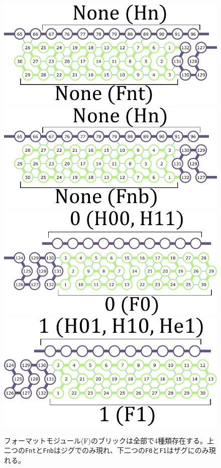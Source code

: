 \documentclass[a4j,11pt]{article}
\begin{document}
%
%
\begin{figure}[tb]
  \centering
   \includegraphics[width=0.6\linewidth]{fig/svg/Fnt_1.pdf}\\
 \vspace*{10mm}
   \includegraphics[width=0.6\linewidth]{fig/svg/Fnb_1.pdf}\\
 \vspace*{10mm}
   \includegraphics[width=0.6\linewidth]{fig/svg/F0_1.pdf}\\
 \vspace*{10mm}
   \includegraphics[width=0.6\linewidth]{fig/svg/F1_1.pdf}
 \caption{フォーマットモジュール(F)のブリックは全部で4種類存在する。上二つの\texttt{Fnt}と\texttt{Fnb}はジグでのみ現れ、下二つの\texttt{F0}と\texttt{F1}はザグにのみ現れる。}
 \label{fig:formatters}
\end{figure}
\end{document}
